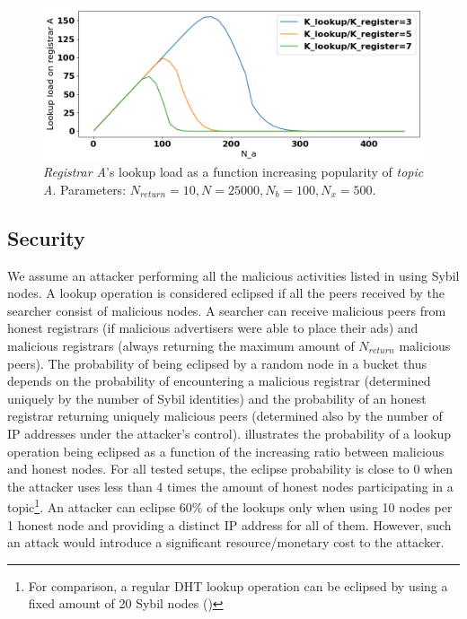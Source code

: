 \begin{figure}[t]
    \includegraphics[width=1\linewidth]{img/fairness_lookup}
    \vspace{-0.05in}
    \caption{\emph{Registrar A}'s lookup load as a function increasing popularity of \emph{topic A}.
		Parameters: $N_\textit{return}=10, N=25000, N_b=100, N_x=500$.}
    \label{fig:fairness_lookup}
    \vspace{-0.15in}
\end{figure}

\subsection{Security}

We assume an attacker performing all the malicious activities listed in  using Sybil nodes.
A lookup operation is considered eclipsed if all the peers received by the searcher consist of malicious nodes.
A searcher can receive malicious peers from honest registrars (if malicious advertisers were able to place their ads) and malicious registrars (always returning the maximum amount of $N_\textit{return}$ malicious peers).
The probability of being eclipsed by a random node in a bucket thus depends on the probability of encountering a malicious registrar (determined uniquely by the number of Sybil identities) and the probability of an honest registrar returning uniquely malicious peers (determined also by the number of IP addresses under the attacker's control).
 illustrates the probability of a lookup operation being eclipsed as a function of the increasing ratio between malicious and honest nodes.
For all tested setups, the eclipse probability is close to $0$ when the attacker uses less than 4 times the amount of honest nodes participating in a topic\footnote{For comparison, a regular DHT lookup operation can be eclipsed by using a fixed amount of 20 Sybil nodes ()}.
An attacker can eclipse $60\%$ of the lookups only when using 10 nodes per 1 honest node and providing a distinct IP address for all of them.
However, such an attack would introduce a significant resource/monetary cost to the attacker. 

